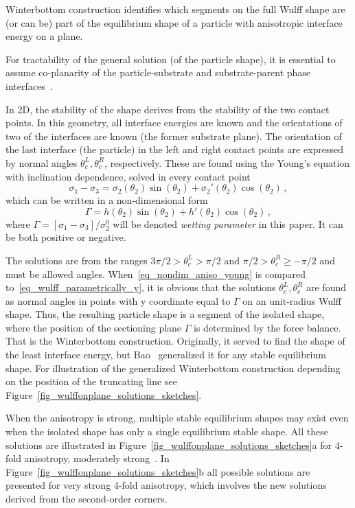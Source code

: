 	Winterbottom construction identifies which segments on the full Wulff shape are (or can be) part of the equilibrium shape of a particle with anisotropic interface energy on a plane. 
	
	For tractability of the general solution (of the particle shape), it is essential to assume co-planarity of the particle-substrate and substrate-parent phase interfaces~\cite{Winterbottom1967, Cahn1974, Bao2017}. 
	
	In 2D, the stability of the shape derives from the stability of the two contact points. In this geometry, all interface energies are known and the orientations of two of the interfaces are known (the former substrate plane). The orientation of the last interface (the particle) in the left and right contact points are expressed by normal angles $\theta_c^L,\theta_c^R$, respectively. These are found using the Young's equation with inclination dependence, solved in every contact point 
	\begin{equation}\label{eq_Young_anisotropic}
		\sigma_1 - \sigma_{3} = \sigma_2(\theta_2)\sin(\theta_2) + \sigma_2'(\theta_2)\cos(\theta_2) \,,
	\end{equation}
	which can be written in a non-dimensional form
	\begin{equation} \label{eq_nondim_aniso_young}
		\Gamma = h(\theta_2)\sin(\theta_2) + h'(\theta_2)\cos(\theta_2) \,,
	\end{equation}
	where $\Gamma = [\sigma_{1}-\sigma_3 ]/\sigma_2^0$ will be denoted \textit{wetting parameter} in this paper. It can be both positive or negative. 
	
	The solutions are from the ranges $3\pi/2>\theta_c^L>\pi/2$ and $\pi/2>\theta_c^R\geq-\pi/2$ and must be allowed angles. When~\eqref{eq_nondim_aniso_young} is compared to~\eqref{eq_wulff_parametrically_y}, it is obvious that the solutions $\theta_c^L,\theta_c^R$ are found as normal angles in points with y coordinate equal to $\Gamma$ on an unit-radius Wulff shape.  Thus, the resulting particle shape is a segment of the isolated shape, where the position of the sectioning plane $\Gamma$ is determined by the force balance. That is the Winterbottom construction. Originally, it served to find the shape of the least interface energy, but Bao~\cite{Bao2017} generalized it for any stable equilibrium shape. For illustration of the generalized Winterbottom construction depending on the position of the truncating line see Figure~\ref{fig_wulffonplane_solutions_sketches}.
	
	When the anisotropy is strong, multiple stable equilibrium shapes may exist even when the isolated shape has only a single equilibrium stable shape. All these solutions are illustrated in Figure~\ref{fig_wulffonplane_solutions_sketches}a for 4-fold anisotropy, moderately strong~\cite{Bao2017}. In  Figure~\ref{fig_wulffonplane_solutions_sketches}b all possible solutions are presented for very strong 4-fold anisotropy, which involves the new solutions derived from the second-order corners.
	
